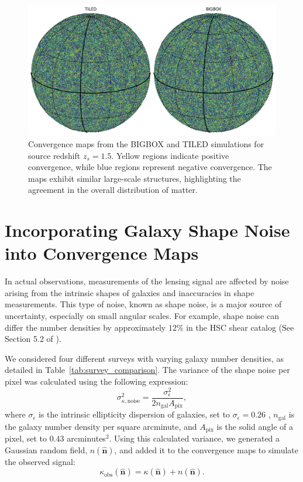 \begin{figure}[ht]
    \centering
    \includegraphics[width=\textwidth]{figures/samplemap.png}
    \caption[Convergence maps from the BIGBOX and TILED simulations]{Convergence maps from the BIGBOX and TILED simulations for source redshift $z_s = 1.5$. Yellow regions indicate positive convergence, while blue regions represent negative convergence. The maps exhibit similar large-scale structures, highlighting the agreement in the overall distribution of matter.}
    \label{fig:convergence_maps}
\end{figure}

\section{Incorporating Galaxy Shape Noise into Convergence Maps}
In actual observations, measurements of the lensing signal are affected by noise arising from the intrinsic shapes of galaxies and inaccuracies in shape measurements. This type of noise, known as shape noise, is a major source of uncertainty, especially on small angular scales. For example, shape noise can differ the number densities by approximately $12 \%$ in the HSC shear catalog (See Section 5.2 of \citealt{2018PASJ...70S..25M}). 

We considered four different surveys with varying galaxy number densities, as detailed in Table~\ref{tab:survey_comparison}. The variance of the shape noise per pixel was calculated using the following expression:
\begin{equation}
    \sigma_{\kappa, \text{noise}}^2 = \frac{\sigma_{\epsilon}^2}{2 n_{\mathrm{gal}} A_{\mathrm{pix}}},
\end{equation}
where $\sigma_{\epsilon}$ is the intrinsic ellipticity dispersion of galaxies, set to $\sigma_{\epsilon} = 0.26$ \citep{2019A&A...627A..59E}, $n_{\mathrm{gal}}$ is the galaxy number density per square arcminute, and $A_{\mathrm{pix}}$ is the solid angle of a pixel, set to $0.43$ arcminutes$^2$. Using this calculated variance, we generated a Gaussian random field, $n(\hat{\mathbf{n}})$, and added it to the convergence maps to simulate the observed signal:
\begin{equation}
    \kappa_{\mathrm{obs}}(\hat{\mathbf{n}}) = \kappa(\hat{\mathbf{n}}) + n(\hat{\mathbf{n}}).
\end{equation}

